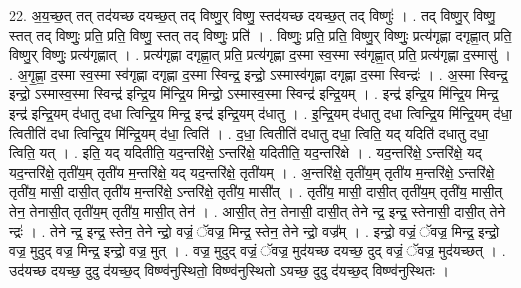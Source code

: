 \documentclass[17pt]{extarticle}
\begin{document}
22. अ॒य॒च्छ॒त् तत् तद॑यच्छ दयच्छ॒त् तद् विष्णु॒र् विष्णु॒ स्तद॑यच्छ दयच्छ॒त् तद् विष्णुः॑ । . तद् विष्णु॒र् विष्णु॒ स्तत् तद् विष्णुः॒ प्रति॒ प्रति॒ विष्णु॒ स्तत् तद् विष्णुः॒ प्रति॑ । . विष्णुः॒ प्रति॒ प्रति॒ विष्णु॒र् विष्णुः॒ प्रत्य॑गृह्णा दगृह्णा॒त् प्रति॒ विष्णु॒र् विष्णुः॒ प्रत्य॑गृह्णात् । . प्रत्य॑गृह्णा दगृह्णा॒त् प्रति॒ प्रत्य॑गृह्णा द॒स्मा स्व॒स्मा स्व॑गृह्णा॒त् प्रति॒ प्रत्य॑गृह्णा द॒स्मासु॑ । . अ॒गृ॒ह्णा॒ द॒स्मा स्व॒स्मा स्व॑गृह्णा दगृह्णा द॒स्मा स्विन्द्र॒ इन्द्रो॒ ऽस्मास्व॑गृह्णा दगृह्णा द॒स्मा स्विन्द्रः॑ । . अ॒स्मा स्विन्द्र॒ इन्द्रो॒ ऽस्मास्व॒स्मा स्विन्द्र॑ इन्द्रि॒य मि॑न्द्रि॒य मिन्द्रो॒ ऽस्मास्व॒स्मा स्विन्द्र॑ इन्द्रि॒यम् । . इन्द्र॑ इन्द्रि॒य मि॑न्द्रि॒य मिन्द्र॒ इन्द्र॑ इन्द्रि॒यम् द॑धातु दधा त्विन्द्रि॒य मिन्द्र॒ इन्द्र॑ इन्द्रि॒यम् द॑धातु । . इ॒न्द्रि॒यम् द॑धातु दधा त्विन्द्रि॒य मि॑न्द्रि॒यम् द॑धा॒ त्वितीति॑ दधा त्विन्द्रि॒य मि॑न्द्रि॒यम् द॑धा॒ त्विति॑ । . द॒धा॒ त्वितीति॑ दधातु दधा॒ त्विति॒ यद् यदिति॑ दधातु दधा॒ त्विति॒ यत् । . इति॒ यद् यदितीति॒ यद॒न्तरि॑क्षे॒ ऽन्तरि॑क्षे॒ यदितीति॒ यद॒न्तरि॑क्षे । . यद॒न्तरि॑क्षे॒ ऽन्तरि॑क्षे॒ यद् यद॒न्तरि॑क्षे॒ तृती॑य॒म् तृती॑य म॒न्तरि॑क्षे॒ यद् यद॒न्तरि॑क्षे॒ तृती॑यम् । . अ॒न्तरि॑क्षे॒ तृती॑य॒म् तृती॑य म॒न्तरि॑क्षे॒ ऽन्तरि॑क्षे॒ तृती॑य॒ मासी॒ दासी॒त् तृती॑य म॒न्तरि॑क्षे॒ ऽन्तरि॑क्षे॒ तृती॑य॒ मासी᳚त् । . तृती॑य॒ मासी॒ दासी॒त् तृती॑य॒म् तृती॑य॒ मासी॒त् तेन॒ तेनासी॒त् तृती॑य॒म् तृती॑य॒ मासी॒त् तेन॑ । . आसी॒त् तेन॒ तेनासी॒ दासी॒त् तेने न्द्र॒ इन्द्र॒ स्तेनासी॒ दासी॒त् तेने न्द्रः॑ । . तेने न्द्र॒ इन्द्र॒ स्तेन॒ तेने न्द्रो॒ वज्रं॒ ॅवज्र॒ मिन्द्र॒ स्तेन॒ तेने न्द्रो॒ वज्र᳚म् । . इन्द्रो॒ वज्रं॒ ॅवज्र॒ मिन्द्र॒ इन्द्रो॒ वज्र॒ मुदुद् वज्र॒ मिन्द्र॒ इन्द्रो॒ वज्र॒ मुत् । . वज्र॒ मुदुद् वज्रं॒ ॅवज्र॒ मुद॑यच्छ दयच्छ॒ दुद् वज्रं॒ ॅवज्र॒ मुद॑यच्छत् । . उद॑यच्छ दयच्छ॒ दुदु द॑यच्छ॒द् विष्ण्व॑नुस्थितो॒ विष्ण्व॑नुस्थितो ऽयच्छ॒ दुदु द॑यच्छ॒द् विष्ण्व॑नुस्थितः । \newline
\end{document}
